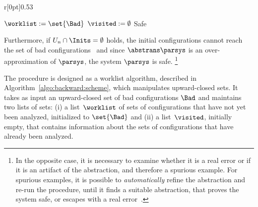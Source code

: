 %
\noindent%
\begin{wrapfigure}{r}[0pt]{0.53\linewidth}
\hfill%
\begin{algorithm}[H]
\DontPrintSemicolon
\caption{Backward Scheme}
\label{algo:backward:scheme}
$\worklist := \set{\Bad}$\;%
$\visited := \emptyset$\;%
%
\Return Safe%
\end{algorithm}
\end{wrapfigure}
%
Furthermore, if $U_n\cap\Inits=\emptyset$ holds, %
the initial configurations cannot reach the set of bad configurations
\Bad\ and since $\abstrans\parsys$ is an over-approximation of
$\parsys$, the system $\parsys$ is safe.%
\footnote{%
  In the opposite case, it is necessary to examine whether it is a
  real error or if it is an artifact of the abstraction, and therefore
  a spurious example. %
  For spurious examples, it is possible to \emph{automatically} refine
  the abstraction and \mbox{re-run} the procedure, until it finds a
  suitable abstraction, that proves the system safe, or escapes with a
  real error~\cite{CEGAR}.%
}
%

The procedure is designed as a worklist algorithm, described in
Algorithm~\ref{algo:backward:scheme}, which manipulates upward-closed
sets. %
It takes as input an upward-closed set of bad configurations $\Bad$
and maintains two lists of %
sets: %
(i) a list~$\worklist$ of sets of configurations that have not yet
been analyzed, initialized to $\set{\Bad}$ and %
(ii) a list~$\visited$, initially empty, that contains information
about the sets of configurations that have already been analyzed.

